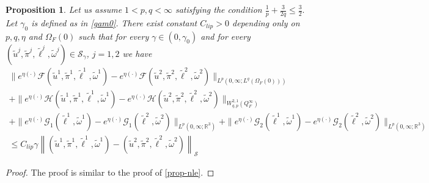 \documentclass[12pt,a4paper,reqno]{amsart}
\newtheorem{proposition}[theorem]{Proposition}
\theoremstyle{definition}
\theoremstyle{remark}
\numberwithin{equation}{section}
\newcommand{\ofo}{\Omega_{F}(0)}
\newcommand{\rt}{\mathbb{R}^{3}}
\newcommand{\ds}{\displaystyle}
\begin{document}
\begin{proposition} \label{prop-nlpe}
Let us assume $1 < p,q < \infty$ satisfying the condition  $\ds \frac{1}{p} + \frac{3}{2q} \leqslant \frac{3}{2}.$ Let $\gamma_{0}$ is defined as in \eqref{gam0}.
There exist constant   $C_{lip} > 0$  depending only on $p,q,\eta$ and $\Omega_{F}(0)$ such that for every $\gamma \in (0, \gamma_{0})$ and for every  $(\widetilde u^{j},\widetilde \pi^{j},\widetilde \ell^{j},\widetilde \omega^{j})  \in {\mathcal S}_{\gamma}$,  $j=1,2$ we have
\begin{multline} \label{e-nlp}
\|e^{\eta (\cdot)}\mathcal{F}(\widetilde u^{1},\widetilde \pi^{1},\widetilde \ell^{1},\widetilde \omega^{1}) - e^{\eta (\cdot)}\mathcal{F}(\widetilde u^{2},\widetilde \pi^{2},\widetilde \ell^{2},\widetilde \omega^{2})\|_{L^{p}(0,\infty;L^{q}(\ofo))} \\
+ \|e^{\eta (\cdot)}\mathcal{H}(\widetilde u^{1},\widetilde \pi^{1},\widetilde \ell^{1},\widetilde \omega^{1}) - e^{\eta (\cdot)}\mathcal{H}(\widetilde u^{2},\widetilde \pi^{2},\widetilde \ell^{2},\widetilde \omega^{2})\|_{W^{2,1}_{q,p}(Q_{F}^{\infty})} \\
 + \|e^{\eta (\cdot)}\mathcal {G}_{1}(\widetilde \ell^{1},\widetilde \omega^{1}) - e^{\eta (\cdot)}\mathcal {G}_{1}(\widetilde \ell^{2},\widetilde \omega^{2})\|_{L^{p}(0,\infty;\rt)} + \|e^{\eta (\cdot)}\mathcal {G}_{2}(\widetilde \ell^{1},\widetilde \omega^{1}) - e^{\eta (\cdot)}\mathcal {G}_{2}(\widetilde \ell^{2},\widetilde \omega^{2})\|_{L^{p}(0,\infty;\rt)} \\
 \leqslant  C_{lip} \gamma  \left\|(\widetilde u^{1},\widetilde \pi^{1},\widetilde \ell^{1},\widetilde \omega^{1}) -  (\widetilde u^{2},\widetilde \pi^{2},\widetilde \ell^{2},\widetilde \omega^{2}) \right\|_{\mathcal{S}}
\end{multline}
\end{proposition}
\begin{proof}
The proof is similar to the proof of \cref{prop-nle}.
\end{proof}
\end{document}
